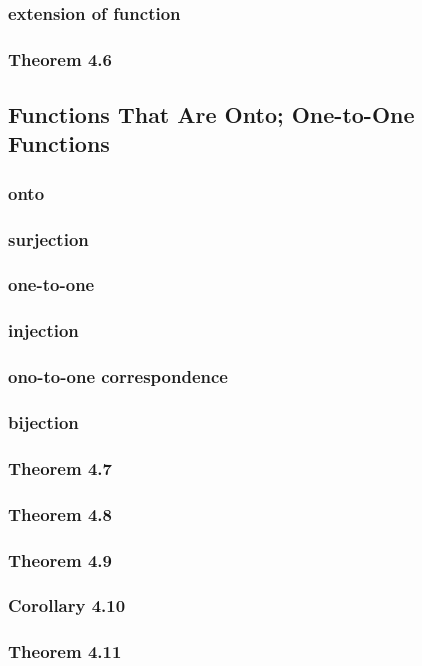 \documentclass[a4paper]{article}
\begin{document}
\subsubsection*{extension of function}
\subsubsection*{Theorem 4.6}

\newpage
\subsection{Functions That Are Onto; One-to-One Functions}   %
\subsubsection*{onto}
\subsubsection*{surjection}
\subsubsection*{one-to-one}
\subsubsection*{injection}
\subsubsection*{ono-to-one correspondence}
\subsubsection*{bijection}
\subsubsection*{Theorem 4.7}
\subsubsection*{Theorem 4.8}
\subsubsection*{Theorem 4.9}
\subsubsection*{Corollary 4.10}
\subsubsection*{Theorem 4.11}
\end{document}
